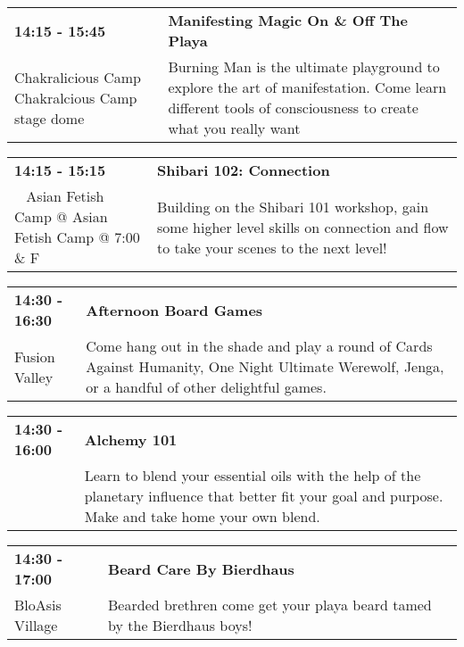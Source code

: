 \begin{tabular}{ p{1in} p{2.2in} }
    \textbf{14:15 - 15:45} & \textbf{Manifesting Magic On \& Off The Playa } \\
    Chakralicious Camp \newline Chakralcious Camp stage dome & Burning Man is the ultimate playground to explore the art of manifestation. Come learn different tools of consciousness to create what you really want \\
    \hline 
\end{tabular}
    
\begin{tabular}{ p{1in} p{2.2in} }
    \textbf{14:15 - 15:15} & \textbf{Shibari 102: Connection} \\
    ~ \newline Asian Fetish Camp @ Asian Fetish Camp @ 7:00 \& F & Building on the Shibari 101 workshop, gain some higher level skills on connection and flow to take your scenes to the next level! \\
    \hline 
\end{tabular}
    
\begin{tabular}{ p{1in} p{2.2in} }
    \textbf{14:30 - 16:30} & \textbf{Afternoon Board Games} \\
    Fusion Valley \newline  & Come hang out in the shade and play a round of Cards Against Humanity, One Night Ultimate Werewolf, Jenga, or a handful of other delightful games. \\
    \hline 
\end{tabular}
    
\begin{tabular}{ p{1in} p{2.2in} }
    \textbf{14:30 - 16:00} & \textbf{Alchemy 101} \\
    ~ \newline  & Learn to blend your essential oils with the help of the planetary influence that better fit your goal and purpose. Make and take home your own blend. \\
    \hline 
\end{tabular}
    
\begin{tabular}{ p{1in} p{2.2in} }
    \textbf{14:30 - 17:00} & \textbf{Beard Care By Bierdhaus} \\
    BloAsis Village \newline  & Bearded brethren come get your playa beard tamed by the Bierdhaus boys! \\
    \hline 
\end{tabular}
    
